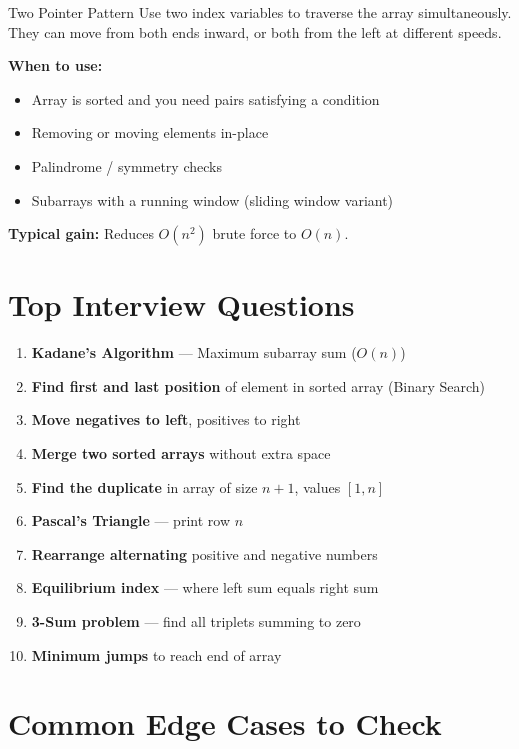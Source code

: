 \documentclass[12pt,a4paper,oneside]{book}
\begin{document}
\begin{definitionbox}{Two Pointer Pattern}
Use two index variables to traverse the array simultaneously. They can move from both ends inward, or both from the left at different speeds.

\textbf{When to use:}
\begin{itemize}
  \item Array is sorted and you need pairs satisfying a condition
  \item Removing or moving elements in-place
  \item Palindrome / symmetry checks
  \item Subarrays with a running window (sliding window variant)
\end{itemize}
\textbf{Typical gain:} Reduces $O(n^2)$ brute force to $O(n)$.
\end{definitionbox}

\section{Top Interview Questions}

\begin{interviewcorner}
\begin{enumerate}
  \item \textbf{Kadane's Algorithm} --- Maximum subarray sum ($O(n)$)
  \item \textbf{Find first and last position} of element in sorted array (Binary Search)
  \item \textbf{Move negatives to left}, positives to right
  \item \textbf{Merge two sorted arrays} without extra space
  \item \textbf{Find the duplicate} in array of size $n+1$, values $[1,n]$
  \item \textbf{Pascal's Triangle} --- print row $n$
  \item \textbf{Rearrange alternating} positive and negative numbers
  \item \textbf{Equilibrium index} --- where left sum equals right sum
  \item \textbf{3-Sum problem} --- find all triplets summing to zero
  \item \textbf{Minimum jumps} to reach end of array
\end{enumerate}
\end{interviewcorner}

\section{Common Edge Cases to Check}
\end{document}
